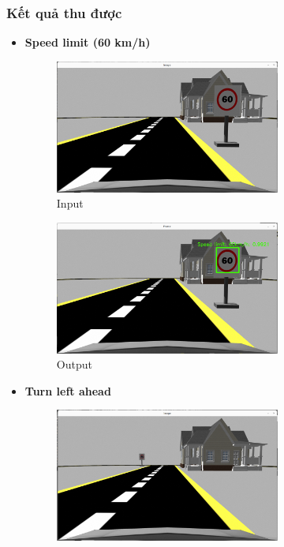 \subsubsection*{Kết quả thu được}
\newpage
\begin{itemize}
    \item \textbf{Speed limit (60 km/h)}
    \begin{figure}[htbp]
    \centering
    \includegraphics[width = 0.7\textwidth]{images/2c-sign/60-in.png}
    \caption{Input}
\end{figure}
    \begin{figure}[htbp]
    \centering
    \includegraphics[width = 0.7\textwidth]{images/2c-sign/60-out.png}
    \caption{Output}
\end{figure}
\newpage
    \item \textbf{Turn left ahead}
    \begin{figure}[htbp]
    \centering
    \includegraphics[width = 0.7\textwidth]{images/2c-sign/left-in.png}

\end{figure}
\end{itemize}

